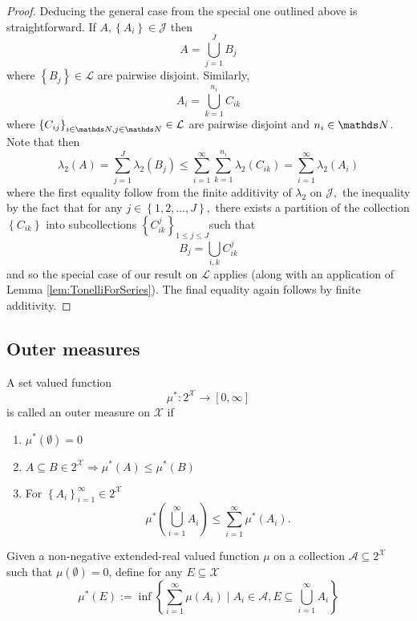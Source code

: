 \begin{proof}
Deducing the general case from the special one outlined above is straightforward.
If $A,\left\{ A_{i}\right\} \in\mathcal{J}$ then 
\[
A=\bigcup_{j=1}^{J}B_{j}
\]
where $\left\{ B_{j}\right\} \in\mathcal{L}$ are pairwise disjoint.
Similarly, 
\[
A_{i}=\bigcup_{k=1}^{n_{i}}C_{ik}
\]
where $\left\{ C_{ij}\right\} _{i\in\N,j\in\N}\in\mathcal{L}$ are
pairwise disjoint and $n_{i}\in\N$. Note that then
\[
\lambda_{2}\left(A\right)=\sum_{j=1}^{J}\lambda_{2}\left(B_{j}\right)\leq\sum_{i=1}^{\infty}\sum_{k=1}^{n_{i}}\lambda_{2}\left(C_{ik}\right)=\sum_{i=1}^{\infty}\lambda_{2}\left(A_{i}\right)
\]
where the first equality follow from the finite additivity of $\lambda_{2}$
on $\mathcal{J},$ the inequality by the fact that for any $j\in\left\{ 1,2,\ldots,J\right\} ,$
there exists a partition of the collection $\left\{ C_{ik}\right\} $
into subcollections $\left\{ C_{ik}^{j}\right\} _{1\leq j\leq J}$such
that 
\[
B_{j}=\bigcup_{i,k}C_{ik}^{j}
\]
and so the special case of our result on $\mathcal{L}$ applies (along
with an application of Lemma \ref{lem:TonelliForSeries}). The final
equality again follows by finite additivity. 
\end{proof}

\subsection{Outer measures}
\begin{defn}
\label{def:outerMeasure}A set valued function 
\[
\mu^{*}:2^{\mathcal{X}}\longrightarrow\left[0,\infty\right]
\]
is called an outer measure on $\mathcal{X}$ if

\begin{enumerate}[label=(\roman*),leftmargin=.1\linewidth,rightmargin=.4\linewidth]
	\item $ \mu^*\left(\emptyset\right) = 0$ 
	\item $A\subseteq B \in 2^\mathcal{X} \Longrightarrow \mu^*\left(A\right) \leq \mu^*\left(B\right) $
	\item For $\left\{A_i\right\}_{i=1}^{\infty}\in 2^\mathcal{X}$ 
	\[
			\mu^*\left(\bigcup_{i=1}^{\infty}A_i\right) \leq \sum_{i=1}^{\infty}\mu^*\left(A_i\right).
	\]
\end{enumerate}
\end{defn}

\begin{example}
\label{exa:canonicalOuterMeasure}Given a non-negative extended-real
valued function $\mu$ on a collection $\mathcal{A\subseteq}2^{\mathcal{X}}$
such that $\mu\left(\emptyset\right)=0$, define for any $E\subseteq\mathcal{X}$
\[
\mu^{*}\left(E\right):=\inf\left\{ \sum_{i=1}^{\infty}\mu\left(A_{i}\right)\mid A_{i}\in\mathcal{A},E\subseteq\bigcup_{i=1}^{\infty}A_{i}\right\} 
\]
\end{example}

